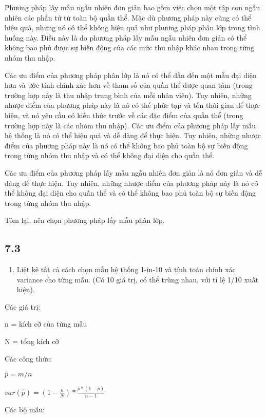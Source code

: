 \documentclass[
]{article}
\providecommand{\tightlist}{%
  \setlength{\itemsep}{0pt}\setlength{\parskip}{0pt}}
\begin{document}
Phương pháp lấy mẫu ngẫu nhiên đơn giản bao gồm việc chọn một tập con
ngẫu nhiên các phần tử từ toàn bộ quần thể. Mặc dù phương pháp này cũng
có thể hiệu quả, nhưng nó có thể không hiệu quả như phương pháp phân lớp
trong tình huống này. Điều này là do phương pháp lấy mẫu ngẫu nhiên đơn
giản có thể không bao phủ được sự biến động của các mức thu nhập khác
nhau trong từng nhóm thu nhập.

Các ưu điểm của phương pháp phân lớp là nó có thể dẫn đến một mẫu đại
diện hơn và ước tính chính xác hơn về tham số của quần thể được quan tâm
(trong trường hợp này là thu nhập trung bình của mỗi nhân viên). Tuy
nhiên, những nhược điểm của phương pháp này là nó có thể phức tạp và tốn
thời gian để thực hiện, và nó yêu cầu có kiến thức trước về các đặc điểm
của quần thể (trong trường hợp này là các nhóm thu nhập). Các ưu điểm
của phương pháp lấy mẫu hệ thống là nó có thể hiệu quả và dễ dàng để
thực hiện. Tuy nhiên, những nhược điểm của phương pháp này là nó có thể
không bao phủ toàn bộ sự biến động trong từng nhóm thu nhập và có thể
không đại diện cho quần thể.

Các ưu điểm của phương pháp lấy mẫu ngẫu nhiên đơn giản là nó đơn giản
và dễ dàng để thực hiện. Tuy nhiên, những nhược điểm của phương pháp này
là nó có thể không đại diện cho quần thể và có thể không bao phủ toàn bộ
sự biến động trong từng nhóm thu nhập.

Tóm lại, nên chọn phương pháp lấy mẫu phân lớp.

\hypertarget{section-2}{%
\subsection{7.3}\label{section-2}}

\begin{enumerate}
\def\labelenumi{\alph{enumi})}
\tightlist
\item
  Liệt kê tất cả cách chọn mẫu hệ thống 1-in-10 và tính toán chính xác
  variance cho từng mẫu. (Có 10 giá trị, có thể trùng nhau, với tỉ lệ
  1/10 xuất hiện).
\end{enumerate}

Các giá trị:

n = kích cỡ của từng mẫu

N = tổng kích cỡ

Các công thức:

\(\hat{p} = m/n\)

\(var(\hat{p}) = (1-\frac n N)*\frac{\hat{p}*(1-\hat{p})}{n-1}\)

Các bộ mẫu:
\end{document}
